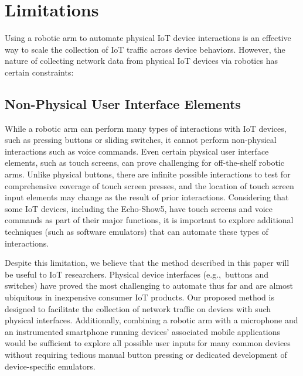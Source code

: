 \section{Limitations}
\label{sec:limit}

Using a robotic arm to automate physical IoT device interactions is an effective way to scale the collection of IoT traffic across device behaviors. However, the nature of collecting network data from physical IoT devices via robotics has certain constraints:

\subsection{Non-Physical User Interface Elements}
While a robotic arm can perform many types of interactions with IoT devices, such as pressing buttons or sliding switches, it cannot perform non-physical interactions such as voice commands. Even certain physical user interface elements, such as touch screens, can prove challenging for off-the-shelf robotic arms. Unlike physical buttons, there are infinite possible interactions to test for comprehensive coverage of touch screen presses, and the location of touch screen input elements may change as the result of prior interactions. Considering that some IoT devices, including the Echo-Show5, have touch screens and voice commands as part of their major functions, it is important to explore additional techniques (such as software emulators) that can automate these types of interactions. 

Despite this limitation, we believe that the method described in this paper will be useful to IoT researchers. Physical device interfaces (e.g.,~buttons and switches) have proved the most challenging to automate thus far and are almost ubiquitous in inexpensive consumer IoT products.
Our proposed method is designed to facilitate the collection of network traffic on devices with such physical interfaces. Additionally, combining a robotic arm with a microphone and an instrumented smartphone running devices' associated mobile applications would be sufficient to explore all possible user inputs for many common devices without requiring
tedious manual button pressing or dedicated development of device-specific emulators. 


